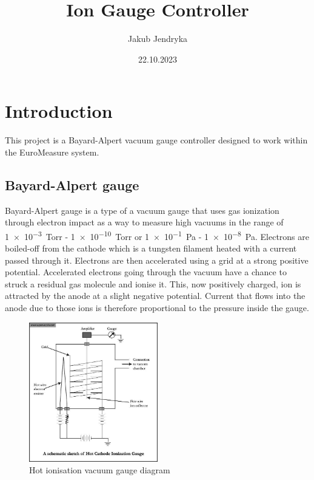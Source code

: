 \documentclass{article}
\title{Ion Gauge Controller}
\author{Jakub Jendryka}
\date{22.10.2023}
\begin{document}
\maketitle

\section{Introduction}
This project is a Bayard-Alpert vacuum gauge controller designed to work within the EuroMeasure system.
\subsection{Bayard-Alpert gauge}
Bayard-Alpert gauge is a type of a vacuum gauge that uses gas ionization through electron impact as a way
to measure high vacuums in the range of \SI{1e-3}{Torr} - \SI{1e-10}{Torr} or \SI{1e-1}{\pascal} - \SI{1e-8}{\pascal}.
Electrons are boiled-off from the cathode which is a tungsten filament heated with a current passed through it.
Electrons are then accelerated using a grid at a strong positive potential.
Accelerated electrons going through the vacuum have a chance to struck a residual gas molecule and ionise it.
This, now positively charged, ion is attracted by the anode at a slight negative potential.
Current that flows into the anode due to those ions is therefore proportional to the pressure inside the gauge.

\begin{figure}[H]
	\begin{center}
		\includegraphics[width=0.5\textwidth]{figures/ion_gauge.jpg}
	\end{center}
	\caption{Hot ionisation vacuum gauge diagram}
	\label{fig:ion_gauge}
\end{figure}
\end{document}
